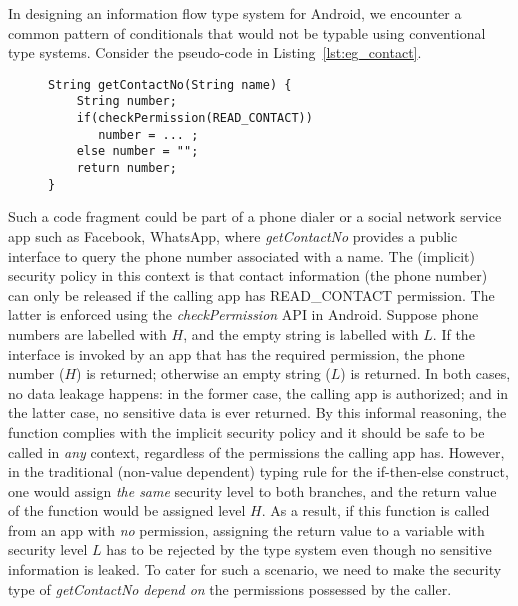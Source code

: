 In designing an information flow type system for Android, we encounter
a common pattern of conditionals that would not be typable using conventional type systems.
Consider the pseudo-code in Listing~\ref{lst:eg_contact}.
\begin{figure}[ht]
\begin{lstlisting}[caption={Sample code for getting contact info with a permission check.}, label={lst:eg_contact}]
String getContactNo(String name) {
    String number;
    if(checkPermission(READ_CONTACT))
       number = ... ;
    else number = "";
    return number;
}
\end{lstlisting}
\end{figure}
Such a code fragment could be part of a phone dialer or a social network service app such as Facebook, WhatsApp, where \textit{getContactNo} provides
a public interface to query the phone number associated with a name. The (implicit) security policy in this
context is that contact information (the phone number) can only be released if the calling app has
READ\_CONTACT permission.
The latter is enforced using the \textit{checkPermission} API in Android.
Suppose phone numbers are labelled with $H$, and the empty string is labelled with $L$.
If the interface is invoked by an app that has the required permission,
the phone number ($H$) is returned; otherwise an empty string ($L$)
is returned. In both cases, no data leakage happens: in the former case, the calling app is authorized; and in the latter case, no sensitive data is ever returned. By this informal reasoning, the function complies with the implicit security policy and it
should be safe to be called in \emph{any} context, regardless of the permissions the calling app has.
However, in the traditional (non-value dependent) typing rule for the if-then-else construct, one would assign \emph{the same} security level to both branches,
and the return value of the function would be assigned level $H$.
As a result, if this function is called from an app with \emph{no} permission, assigning the return value to a variable with security level $L$ has to be rejected by the type system even though no sensitive information is leaked.
To cater for such a scenario, we need to make the security type of \textit{getContactNo}
 \emph{depend on} the permissions possessed by the caller.

